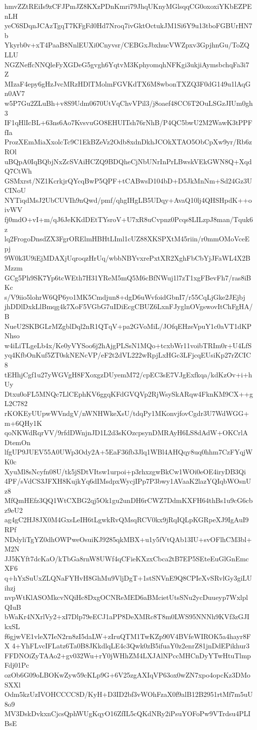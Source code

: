 hmvZZtREiIs9zCFJPmJZ8KXzPDnKmri79JhqUKnyMGlsqqCG0oxoxiYKbEZPEnLH
yeC6SDqnJCAzTgqT7KFgFd0Hd7Nroq7ivGktOctukJM1Si6Y9u13tboFGBUrHN7b
Ykyrb0v+xT4PaaB8NnlEUXi0Cnyvsr/CEBGxJbxhucVWZpxv3GpjhnGu/ToZQLLU
NGZNeffcNNQleFyXGDeG5gvgh6YqtvM3KphyomqhNFKgi3ukjiAymsbchqFa3i7Z
MIzaF4epy6gHzJvcMRzHDlTMolmFGVKdTX6M8wbonTXZQ3F0dG149u1lAqGn0AV7
w5P7Gu2ZLuBh+v8S9Udm0670UtVqChvVPil3/j8oaef48CC6T2OuLSGzJIUm0gh3
IF1qHlIcBL+63ns6Ao7KvsvuGO8EHUITsh76rNhB/P4QC5bwU2M2WawK3tPPFfIa
ProzXEmMiaXxolcTc9C1EkBZeVz2Odb8xdnDkhJCOkXTAO5ObCpXw9yr/Rb6zROl
uBQpA0IqBQbjNxZcSVAiHCZQ9BDQheCjNbUNrInPrLBwskVEkGWN8Q+XqdQ7CtWh
GSMxrst/NZ1KcrkjrQYcqBwP5QPF+tCABwsD104bD+D5JkMnNm+Sd24Gz3UCINoU
NYTiqdMsJ2UbCUVIh9nQwd/pmf/qhgIHgLB5UDqy+AvaQ10lj4QHSHpdK++oivWV
fj0mdO+vI+m/qJ6JeKKdDEtTYsroV+U7xR8uCvpnz0Pcqs8LILzpJ8man/Tquk6z
lq2FrogoDnsdZX3FgrORElmHBHtLIml1cUZ88XKSPXtM45riin/r0mmOMoVceEpj
9W0k3U9iEjMDAXjUqroqzHrUq/wbbNBYvxrePxtXR2XghFbCbYjJFaWL4X2BMzzm
GCg5Ph9SK7Yp6tcWEth7H31YReM5mQ5M6cBfNWuj1l7zT1xgFBevFh7/ras8iBKc
s/V9iio5lohrW6QP6yo1MK5Cmdjun8+dgD6uWvfoidGbnI7/r55CqLjGke2JEjbj
jhDDlDxkLlBmqg4k7XoF5VGbG7uIDiEcgCBUZ6LxnFJyglnOVgswovItChFgHA/B
NueU2SKBGLrMZgblDql2nR1QTqV+pa2GVoMiL/JOfqEHzeVpuY1c0aVT1dKPNhso
w4iLiTLgeLb4x/Ke0yVYSoo6j2hAjgPLSsN1MQo+tcxbWr11voibTRIm0r+U4LfS
yq4KfbOnKuf5ZT0skNENcVP/eF2t2dVL222wRpjLxHGc3LFjcqEUsiKp27rZCIC8
tEHhjCgf1u27yWGVgH8FXoxgzDUyemM72/cpEC3sE7VJgExfkqa/kdKzOv+i+hUy
Dtxu0oFL5MNQc7LlCEphKV6ggqKFdGVQVp2RjWsySkARqw4FknKM9CX++gL2C782
rKOKEyUUpwWVndgV/nWNHWkeXsU/tdqPy1MKonvjfovCgdr3U7WdWGG+m+6QHy1K
qoNKWdRqrVV/9rfdDWnjnJD1L2d3sKOzcpsynDMRAyH6LS8dAdW+OKCrlADtemOn
lfgUP9JUEV55A0UWp3Ody2A+5EaF36fb3Jlq1WBl4AHQqy8uq0hhm7CzFYqjWK0c
XyuMl8sNcyfn08U/tk5jSDtVItsw1urpoi+p3rhxzgwBkCw1WOi0eOE4iryDB3Qi
4PF/sVdCS3JFXH8KujkYq6dIMsdpxWycjIPp7P3bwy1AVaaK2lazYQIqbWOsnUz8
MfQmHEfz3QQ1WtCXBG2qj5Ok1gu2unDH6rCWZ7DdmKXFH64thBs1u9cG6cbz9eU2
ag4gC2HJ8JX0M4GxsLeIH6tLgwkRvQMsqRCV0kx9jRqIQLpKGRpeXJ9IgAuI9RPf
NDdyliTgYZ0dhOWPweOsuiKJ9285qkMBX+u1y5fVtQAb13IU+svOFlhCM3bl+M2N
JJ5KYft7dcKaO/kTbGa8rnW8UWf4qCFieKXzxCbca2tB7EP5SEteEuGlGnEmcXF6
q+hYxSuUxZLQNaFYHvH8GhMu9VljDgT+1stSNVnE9Q8CPIeXvSRvlGy3giLUihzj
nvpWtKlASOMkcvNQiHc8DxgOCNReMED6aBMcietUtsSNu2ycDuueyp7WxlplQIuB
bWaKr4NXrlVy2+xI7Dlp79eECJ1aPP8DeXMRc8T8m0LWS95NNNh9KVf3zGJIkxSL
f6gjwVE1vleX7IeN2rn8zI5daLW+zIruQTM1TwKZp90V4BVfeWIROK5a4hayr8FX
4+YhFLvcIFLatz6Ta0B8JKkdlqLE4c3Qwk0zB5ifuaY0z2enrZ81jnDdEPikhur3
FFDNOiZyTAAo2+gv032Wu+rY0jWHhZM4LXJAlNPccMHCnDyYTwHtuTlmpFdj01Pc
ozOb6G09oLBOKwZyw59cKLp9G+6V25zgAXIqVP63ox0wZN7xpo4opcKz3DMoSXXl
Odm5kzUzIVOHCCCC8D/KyH+D3ID2bf3vWOhFzaX0f9alB12B2951rtMf7m5uU8o9
MV3DskDvkxnCjcsQphWUgKqyO16ZfIL5cQKdNRy2iPsuYOFoPw9VTrdsu4PLIBsE
